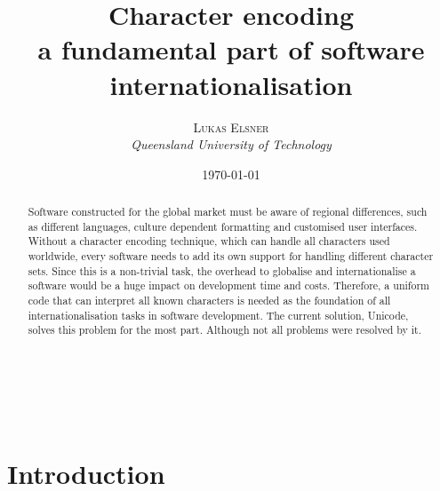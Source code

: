 \documentclass[a4paper, 12pt]{scrartcl} %
\title{\textbf{Character encoding}\\ %
a fundamental part of software internationalisation} %
\author{\textsc{Lukas Elsner} %
\\{\textit{Queensland University of Technology}}} %
\date{\today} %
\makeatletter
\renewcommand{\maketitle}{ %
  \begin{flushright} %
    {\LARGE\@title}\\ %
    \vspace{50pt} %
    {\large\@author} %
    \\\@date %
    \vspace{40pt} %
  \end{flushright}
}
\makeatother
\begin{document}
\maketitle %
\thispagestyle{empty}
\vspace{10em}
\begin{abstract}
  Software constructed for the global market must be aware of regional
  differences, such as different languages, culture dependent formatting and
  customised user interfaces. Without a character encoding technique, which can
  handle all characters used worldwide, every software needs to add its own
  support for handling different character sets. Since this is a non-trivial
  task, the overhead to globalise and internationalise a software would be a
  huge impact on development time and costs. Therefore, a uniform code that can
  interpret all known characters is needed as the foundation of all
  internationalisation tasks in software development. The current solution,
  Unicode, solves this problem for the most part. Although not all problems were
  resolved by it.
\end{abstract}
\newpage
\tableofcontents
\newpage

\section{Introduction}
\end{document}
